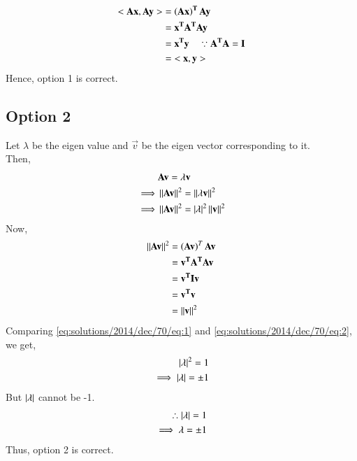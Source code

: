 \begin{align}
    \mathbf{<Ax,Ay>}&= \mathbf{\left(Ax\right)^T Ay} \\
    &=\mathbf{ x^T A^T Ay}\\
    &= \mathbf{x^T y} \quad\because \mathbf{A^TA = I}\\
    &= \mathbf{<x,y>}
\end{align}
Hence, option 1 is correct.
\subsection{Option 2}
Let $\lambda$ be the eigen value and $\vec v$ be the eigen vector corresponding to it.\\
Then,
\begin{align}
    &\mathbf{Av} = \lambda\mathbf v\\
    \implies & \left\lVert\mathbf{Av}\right\rVert^2 = \left\lVert\lambda\mathbf v\right\rVert^2\\
    \implies & \left\lVert\mathbf{Av}\right\rVert^2 = \left\vert\lambda\right\vert^2 \left\lVert\mathbf v\right\rVert^2 \label{eq:solutions/2014/dec/70/eq:1}
\end{align}
Now,
\begin{align}
    \left\lVert\mathbf{Av}\right\rVert^2 &= \left(\mathbf{Av}\right)^T \mathbf{Av}\\
    &= \mathbf{v ^TA^TAv} \\
    &= \mathbf{v^TIv}\\
    &=\mathbf{v^Tv}\\
    &=\left\lVert\mathbf v\right\rVert^2 \label{eq:solutions/2014/dec/70/eq:2}
\end{align}
Comparing \eqref{eq:solutions/2014/dec/70/eq:1} and \eqref{eq:solutions/2014/dec/70/eq:2}, we get, 
\begin{align}
    \left\vert\lambda\right\vert^2 =1 \\
    \implies\left\vert\lambda\right\vert= \pm 1
\end{align}
But $\left\vert\lambda\right\vert$ cannot be -1.
\begin{align}
    \therefore \left\vert\lambda\right\vert=1\\
    \implies \lambda = \pm 1
\end{align}
Thus, option 2 is correct.
